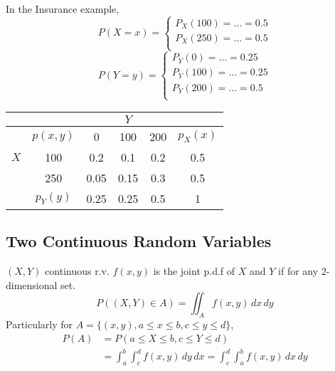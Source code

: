 \begin{exmp}
In the Insurance example,
\[P(X=x)=\begin{cases}
P_X(100)=\dots=0.5\\
P_X(250)=\dots=0.5\\
\end{cases}\]
\[P(Y=y)=\begin{cases}
P_Y(0)=\dots=0.25 \\
P_Y(100)=\dots=0.25\\
P_Y(200)=\dots=0.5\\
\end{cases}\]
\end{exmp}
\begin{center}
\begin{tabular}{|c|c|ccc|c|}
\hline
    &     &    & $Y$ &   & \\
\hline
    & $p(x,y)$ & 0    & 100  & 200 & $p_X(x)$  \\
$X$ & 100      & 0.2  & 0.1  & 0.2 & 0.5 \\
    & 250      & 0.05 & 0.15 & 0.3 & 0.5 \\
    \hline
    & $p_Y(y)$ & 0.25 & 0.25 & 0.5 & 1 \\
\hline
\end{tabular}
\end{center}

\subsection{Two Continuous Random Variables}
$(X,Y)$ continuous r.v. $f(x,y)$ is the joint p.d.f of $X$ and $Y$ if for any 2-dimensional set.
\[P((X,Y)\in A)=\iint_{A} f(x,y)\,dx \,dy\]
Particularly for $A =\{(x,y),a \leq x\leq b,c \leq y \leq d\}$,
\begin{align*}
P(A)&=P(a\leq X \leq b,c  \leq Y \leq d)\\
&= \int_{a}^b \int_c^d f(x,y) \,dy \,dx=\int_c^d \int_{a}^b f(x,y) \,dx \,dy
\end{align*}

